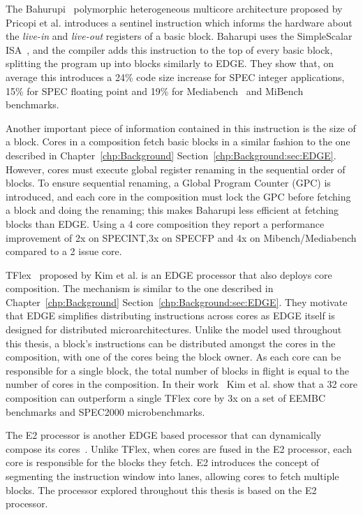 The Bahurupi~\cite{pricopi2012bahurupi} polymorphic heterogeneous multicore architecture proposed by Pricopi et al. introduces a sentinel instruction which informs the hardware about the \textit{live-in} and \textit{live-out} registers of a basic block.
Baharupi uses the SimpleScalar ISA~\cite{burger1997simplescalar}, and the compiler adds this instruction to the top of every basic block, splitting the program up into blocks similarly to EDGE.
They show that, on average this introduces a 24\% code size increase for SPEC integer applications, 15\% for SPEC floating point and 19\% for Mediabench~\cite{mediabench} and MiBench~\cite{mibench} benchmarks.

Another important piece of information contained in this instruction is the size of a block.
Cores in a composition fetch basic blocks in a similar fashion to the one described in Chapter~\ref{chp:Background} Section~\ref{chp:Background:sec:EDGE}.
However, cores must execute global register renaming in the sequential order of blocks.
To ensure sequential renaming, a Global Program Counter (GPC) is introduced, and each core in the composition must lock the GPC before fetching a block and doing the renaming; this makes Baharupi less efficient at fetching blocks than EDGE.
Using a 4 core composition they report a performance improvement of 2x on SPECINT,3x on SPECFP and 4x on Mibench/Mediabench compared to a 2 issue core. 

TFlex~\cite{kim2007tflex} proposed by Kim et al. is an EDGE processor that also deploys core composition.
The mechanism is similar to the one described in Chapter~\ref{chp:Background} Section~\ref{chp:Background:sec:EDGE}.
They motivate that EDGE simplifies distributing instructions across cores as EDGE itself is designed for distributed microarchitectures.
Unlike the model used throughout this thesis, a block's instructions can be distributed amongst the cores in the composition, with one of the cores being the block owner.
As each core can be responsible for a single block, the total number of blocks in flight is equal to the number of cores in the composition.
In their work~\cite{kim2007tflex} Kim et al. show that a 32 core composition can outperform a single TFlex core by 3x on a set of EEMBC benchmarks and SPEC2000 microbenchmarks.

The E2 processor is another EDGE based processor that can dynamically compose its cores~\cite{putnam2010e2}.
Unlike TFlex, when cores are fused in the E2 processor, each core is responsible for the blocks they fetch.
E2 introduces the concept of segmenting the instruction window into lanes, allowing cores to fetch multiple blocks.
The processor explored throughout this thesis is based on the E2 processor.

